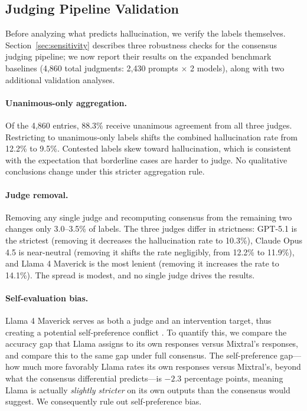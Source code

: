 \subsection{Judging Pipeline Validation}
\label{sec:judge-validation}

Before analyzing what predicts hallucination, we verify the labels themselves. Section~\ref{sec:sensitivity} describes three robustness checks for the consensus judging pipeline; we now report their results on the expanded benchmark baselines (4,860 total judgments: 2,430 prompts $\times$ 2 models), along with two additional validation analyses.

\paragraph{Unanimous-only aggregation.} Of the 4,860 entries, 88.3\% receive unanimous agreement from all three judges. Restricting to unanimous-only labels shifts the combined hallucination rate from 12.2\% to 9.5\%. Contested labels skew toward hallucination, which is consistent with the expectation that borderline cases are harder to judge. No qualitative conclusions change under this stricter aggregation rule.

\paragraph{Judge removal.} Removing any single judge and recomputing consensus from the remaining two changes only 3.0--3.5\% of labels. The three judges differ in strictness: GPT-5.1 is the strictest (removing it decreases the hallucination rate to 10.3\%), Claude Opus 4.5 is near-neutral (removing it shifts the rate negligibly, from 12.2\% to 11.9\%), and Llama 4 Maverick is the most lenient (removing it increases the rate to 14.1\%). The spread is modest, and no single judge drives the results.

\paragraph{Self-evaluation bias.} Llama 4 Maverick serves as both a judge and an intervention target, thus creating a potential self-preference conflict \citep{wataoka2024selfpreference}. To quantify this, we compare the accuracy gap that Llama assigns to its own responses versus Mixtral's responses, and compare this to the same gap under full consensus. The self-preference gap---how much more favorably Llama rates its own responses versus Mixtral's, beyond what the consensus differential predicts---is $-2.3$ percentage points, meaning Llama is actually \emph{slightly stricter} on its own outputs than the consensus would suggest. We consequently rule out self-preference bias.

